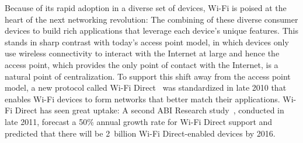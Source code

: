 Because of its rapid adoption in a diverse set of devices, Wi-Fi is poised at the heart of the next networking revolution: The combining of these diverse consumer devices to build rich applications that leverage each device's unique features. This stands in sharp contrast with today's access point model, in which devices only use wireless connectivity to interact with the Internet at large and hence the access point, which provides the only point of contact with the Internet, is a natural point of centralization. To support this shift away from the access point model, a new protocol called Wi-Fi Direct~\cite{wifi_direct} was standardized in late 2010 that enables Wi-Fi devices to form networks that better match their applications. Wi-Fi Direct has seen great uptake: A second ABI Research study~\cite{ABI_Research_2011}, conducted in late 2011, forecast a 50\% annual growth rate for Wi-Fi Direct support and predicted that there will be 2~billion Wi-Fi Direct-enabled devices by 2016.

%

